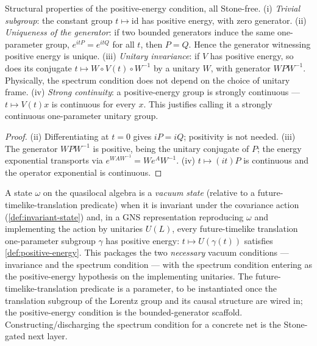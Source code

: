 \begin{theorem}
    \label{thrm:positive-energy-api}
    \leanok
    Structural properties of the positive-energy condition, all Stone-free. (i) \emph{Trivial subgroup}: the constant group $t \mapsto \mathrm{id}$ has positive energy, with zero generator. (ii) \emph{Uniqueness of the generator}: if two bounded generators induce the same one-parameter group, $e^{i t P} = e^{i t Q}$ for all $t$, then $P = Q$. Hence the generator witnessing positive energy is unique. (iii) \emph{Unitary invariance}: if $V$ has positive energy, so does its conjugate $t \mapsto W \circ V(t) \circ W^{-1}$ by a unitary $W$, with generator $W P W^{-1}$. Physically, the spectrum condition does not depend on the choice of unitary frame. (iv) \emph{Strong continuity}: a positive-energy group is strongly continuous --- $t \mapsto V(t) x$ is continuous for every $x$. This justifies calling it a strongly continuous one-parameter unitary group.
\end{theorem}
\begin{proof}
    \leanok
    (ii) Differentiating at $t = 0$ gives $i P = i Q$; positivity is not needed. (iii) The generator $W P W^{-1}$ is positive, being the unitary conjugate of $P$; the energy exponential transports via $e^{W A W^{-1}} = W e^{A} W^{-1}$. (iv) $t \mapsto (i t) P$ is continuous and the operator exponential is continuous.
\end{proof}

\begin{definition}
    \label{def:vacuum-state}
    \leanok
    A state $\omega$ on the quasilocal algebra is a \emph{vacuum state} (relative to a future-timelike-translation predicate) when it is invariant under the covariance action (\ref{def:invariant-state}) and, in a GNS representation reproducing $\omega$ and implementing the action by unitaries $U(L)$, every future-timelike translation one-parameter subgroup $\gamma$ has positive energy: $t \mapsto U(\gamma(t))$ satisfies \ref{def:positive-energy}. This packages the two \emph{necessary} vacuum conditions --- invariance and the spectrum condition --- with the spectrum condition entering as the positive-energy hypothesis on the implementing unitaries. The future-timelike-translation predicate is a parameter, to be instantiated once the translation subgroup of the Lorentz group and its causal structure are wired in; the positive-energy condition is the bounded-generator scaffold. Constructing/discharging the spectrum condition for a concrete net is the Stone-gated next layer.
\end{definition}

